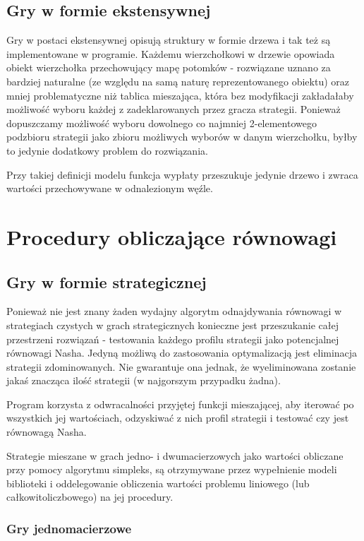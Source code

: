 \documentclass[polish]{standalone}
\begin{document}
\subsection{Gry w formie ekstensywnej}

Gry w postaci ekstensywnej opisują struktury w formie drzewa i tak też są implementowane w programie. Każdemu 
wierzchołkowi w drzewie opowiada obiekt wierzchołka przechowujący mapę potomków - rozwiązane uznano za bardziej
naturalne (ze względu na samą naturę reprezentowanego obiektu) oraz mniej problematyczne niż tablica mieszająca,
która bez modyfikacji zakładałaby możliwość wyboru każdej z zadeklarowanych przez gracza strategii. Ponieważ dopuszczamy
możliwość wyboru dowolnego co najmniej 2-elementowego podzbioru strategii jako zbioru możliwych wyborów w danym
wierzchołku, byłby to jedynie dodatkowy problem do rozwiązania.

Przy takiej definicji modelu funkcja wypłaty przeszukuje jedynie drzewo i zwraca wartości przechowywane
w odnalezionym węźle.

\section{Procedury obliczające równowagi}

\subsection{Gry w formie strategicznej}

Ponieważ nie jest znany żaden wydajny algorytm odnajdywania równowagi w strategiach czystych w grach strategicznych
konieczne jest przeszukanie całej przestrzeni rozwiązań - testowania każdego profilu strategii jako potencjalnej
równowagi Nasha. Jedyną możliwą do zastosowania optymalizacją jest eliminacja strategii zdominowanych. Nie gwarantuje
ona jednak, że wyeliminowana zostanie jakaś znacząca ilość strategii (w najgorszym przypadku żadna).

Program korzysta z odwracalności przyjętej funkcji mieszającej, aby iterować po wszystkich jej wartościach, odzyskiwać
z nich profil strategii i testować czy jest równowagą Nasha.

Strategie mieszane w grach jedno- i dwumacierzowych jako wartości obliczane przy pomocy algorytmu simpleks, są
otrzymywane przez wypełnienie modeli biblioteki  i oddelegowanie obliczenia wartości problemu
liniowego (lub całkowitoliczbowego) na jej procedury.

\subsubsection{Gry jednomacierzowe}
\end{document}
